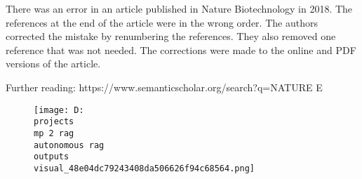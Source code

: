 \documentclass[12pt,a4paper]{article}
\begin{document}
There was an error in an article published in Nature Biotechnology in 2018. The references at the end of the article were in the wrong order. The authors corrected the mistake by renumbering the references. They also removed one reference that was not needed. The corrections were made to the online and PDF versions of the article.

Further reading: https://www.semanticscholar.org/search?q=NATURE%
E%
\begin{figure}[h]
\centering
\texttt{[image: D:\\projects\\mp 2 rag\\autonomous rag\\outputs\\visual\_48e04dc79243408da506626f94c68564.png]}
\end{figure}
\end{document}
